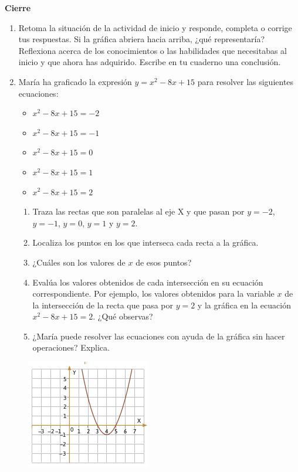 \documentclass[11pt]{book}
\begin{document}
\begin{boxK}
    \begin{center}\textbf{Cierre}\end{center}

    \begin{enumerate}
        \item Retoma la situación de la actividad de inicio y responde, completa o corrige
              tus respuestas. Si la gráfica abriera hacia arriba, ¿qué representaría?
              Reflexiona acerca de los conocimientos o las habilidades que necesitabas al
              inicio y que ahora has adquirido. Escribe en tu cuaderno una conclusión.
        \item María ha graficado la expresión $y = x^2-8x + 15$ para resolver las siguientes
              ecuaciones:
              \begin{itemize}
                  \item $x^2-8x + 15 = -2$
                  \item $x^2-8x + 15 = -1$
                  \item $x^2-8x + 15 = 0$
                  \item $x^2-8x + 15 = 1$
                  \item $x^2-8x + 15 = 2$
              \end{itemize}
              \begin{enumerate}
                  \item Traza las rectas que son paralelas al eje X y que pasan por $y = -2$, $y = -1$, $y = 0$, $y = 1$ y $y = 2$.
                  \item Localiza los puntos en los que interseca cada recta a la gráfica.
                  \item ¿Cuáles son los valores de $x$ de esos puntos?
                  \item Evalúa los valores obtenidos de cada intersección en su ecuación correspondiente. Por ejemplo, los valores obtenidos para la variable $x$ de la intersección de la recta que pasa por $y = 2$ y la gráfica en la ecuación $x^2 - 8x + 15 = 2$. ¿Qué observas?
                  \item ¿María puede resolver las ecuaciones con ayuda de la gráfica sin hacer operaciones? Explica.
              \end{enumerate}
    \end{enumerate}

    \begin{figure}[H]
        \centering
        \includegraphics[width=0.4\linewidth]{s7l2_cierre.png}
        \label{fig:s7l2_cierre}
    \end{figure}
\end{boxK}
\end{document}
